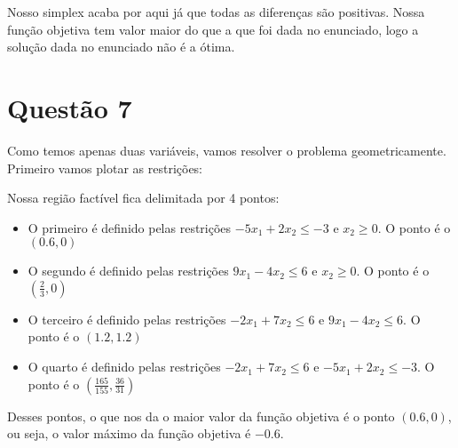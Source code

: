 \documentclass[11pt]{article}
\begin{document}
Nosso simplex acaba por aqui já que todas as diferenças são positivas. Nossa função objetiva tem valor maior do que a que foi dada no enunciado, logo a solução dada no enunciado não é
a ótima.

\section{Questão 7}
\label{sec:orga334fc4}
Como temos apenas duas variáveis, vamos resolver o problema geometricamente. Primeiro vamos plotar as restrições:


Nossa região factível fica delimitada por 4 pontos:

\begin{itemize}
\item O primeiro é definido pelas restrições \(-5x_1+2x_2 \leq -3\) e \(x_2 \geq 0\). O ponto é o \((0.6, 0)\)
\item O segundo é definido pelas restrições \(9x_1-4x_2 \leq 6\) e \(x_2 \geq 0\). O ponto é o \((\frac{2}{3}, 0)\)
\item O terceiro é definido pelas restrições \(-2x_1+7x_2 \leq 6\) e \(9x_1-4x_2 \leq 6\). O ponto é o \((1.2, 1.2)\)
\item O quarto é definido pelas restrições \(-2x_1+7x_2 \leq 6\) e \(-5x_1+2x_2 \leq -3\). O ponto é o \((\frac{165}{155}, \frac{36}{31})\)
\end{itemize}

Desses pontos, o que nos da o maior valor da função objetiva é o ponto \((0.6, 0)\), ou seja, o valor máximo da função objetiva é \(-0.6\).
\end{document}
